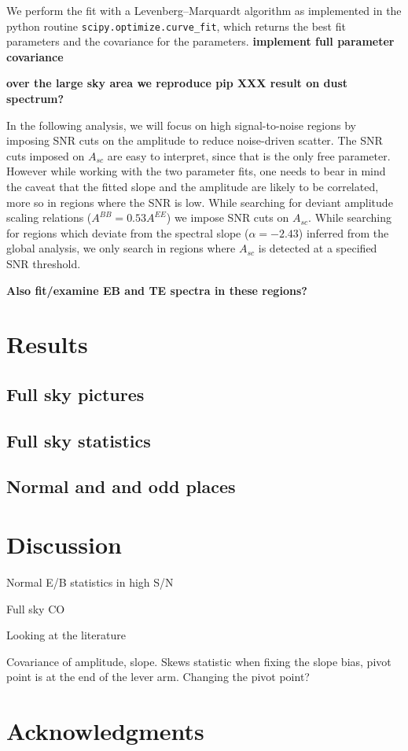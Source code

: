 \documentclass[a4paper,11pt]{article}
\begin{document}
We perform the fit with a Levenberg--Marquardt algorithm as implemented in the python routine \texttt{scipy.optimize.curve\_fit}, which returns the best fit parameters and the covariance for the parameters. \textbf{implement full parameter covariance}

\textbf{over the large sky area we reproduce pip XXX result on dust spectrum?}

In the following analysis, we will focus on high signal-to-noise regions by imposing SNR cuts on the amplitude to reduce noise-driven scatter. The SNR cuts imposed on $A_{sc}$ are easy to interpret, since that is the only free parameter. However while working with the two parameter fits, one needs to bear in mind the caveat that the fitted slope and the amplitude are likely to be correlated, more so in regions where the SNR is low. While searching for deviant amplitude scaling relations ($A^{BB} = 0.53 A^{EE}$)  we impose SNR cuts on $A_{sc}$. While searching for regions which deviate from the spectral slope ($\alpha=-2.43$) inferred from the global analysis, we only search in regions where $A_{sc}$ is detected at a specified SNR threshold.

\textbf{Also fit/examine EB and TE spectra in these regions?}

\section{Results}

\subsection{Full sky pictures}

\subsection{Full sky statistics}

\subsection{Normal and and odd places}


\section{Discussion}



Normal E/B statistics in high S/N

Full sky CO

Looking at the literature

Covariance of amplitude, slope.  Skews statistic when fixing the slope bias, pivot point is at the end of the lever arm.
Changing the pivot point?

\section{Acknowledgments}
\end{document}
